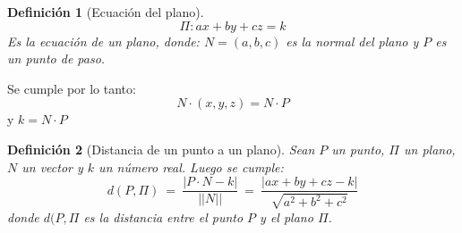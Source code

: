 \documentclass[12pt,a4paper]{extarticle}
\newtheorem{mydef}{Definici\'on}[section]
\begin{document}
\begin{mydef}[Ecuaci\'on del plano]
\[\Pi: ax+by+cz=k\]
Es la ecuaci\'on de un plano, donde:
\(N=(a,b,c)\) es la \emph{normal} del plano y \(P\) es un punto de paso.
\end{mydef}
Se cumple por lo tanto: 
\[N \cdot (x, y, z) = N \cdot P\]
y \(k = N \cdot P\)

\begin{mydef}[Distancia de un punto a un plano]
Sean \(P\) un punto, \(\Pi\) un plano, \(N\) un vector y \(k\) un
n\'umero real. Luego se cumple:
\[ d(P,\Pi) \ = \ \frac{|P \cdot N - k|}{||N||} \ = \ 
\frac{|ax+by+cz-k|}{\sqrt{a^2+b^2+c^2}} \]
donde \(d(P,\Pi\) es la distancia entre el punto \(P\) y el plano \(\Pi\).

\end{mydef}
\end{document}
